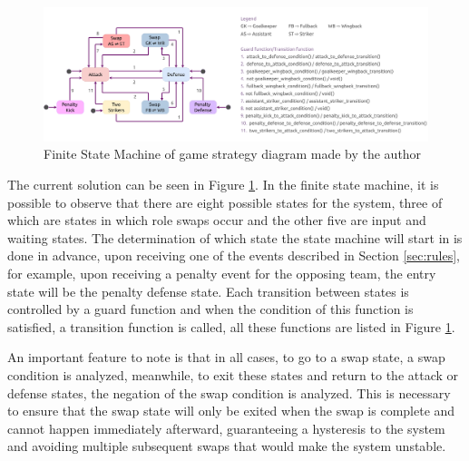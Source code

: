 \begin{figure}[!h]
    \centering
    \includegraphics[width=\linewidth]{images/BehaviorsController FSM.png}
    \caption{Finite State Machine of game strategy diagram made by the author}
    \label{fig:behaviors_controller_fsm}
\end{figure}

The current solution can be seen in Figure \ref{fig:behaviors_controller_fsm}. In the finite state machine, it is possible to observe that there are eight possible states for the system, three of which are states in which role swaps occur and the other five are input and waiting states. The determination of which state the state machine will start in is done in advance, upon receiving one of the events described in Section \ref{sec:rules}, for example, upon receiving a penalty event for the opposing team, the entry state will be the penalty defense state. Each transition between states is controlled by a guard function and when the condition of this function is satisfied, a transition function is called, all these functions are listed in Figure \ref{fig:behaviors_controller_fsm}.

An important feature to note is that in all cases, to go to a swap state, a swap condition is analyzed, meanwhile, to exit these states and return to the attack or defense states, the negation of the swap condition is analyzed. This is necessary to ensure that the swap state will only be exited when the swap is complete and cannot happen immediately afterward, guaranteeing a hysteresis to the system and avoiding multiple subsequent swaps that would make the system unstable.
